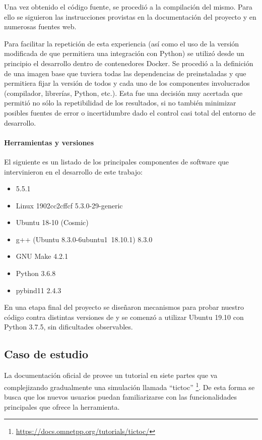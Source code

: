 Una vez obtenido el código fuente, se procedió a la compilación del mismo. Para
ello se siguieron las instrucciones provistas en la documentación del proyecto
y en numerosas fuentes web.

Para facilitar la repetición de esta experiencia (así como el uso de la versión
modificada de \omnetpp{} que permitiera una integración con Python) se utilizó
desde un principio el desarrollo dentro de contenedores Docker. Se procedió a
la definición de una imagen base que tuviera todas las dependencias de \omnetpp{}
preinstaladas y que permitiera fijar la versión de todos y cada uno de los
componentes involucrados (compilador, librerías, Python, etc.). Esta fue una
decisión muy acertada que permitió no sólo la repetibilidad de los resultados,
si no también minimizar posibles fuentes de error o incertidumbre dado el
control casi total del entorno de desarrollo.

\paragraph{Herramientas y versiones}

El siguiente es un listado de los principales componentes de software que
intervinieron en el desarrollo de este trabajo:

\begin{itemize}
    \item \omnetpp{} 5.5.1

    \item Linux 1902cc2cffcf 5.3.0-29-generic

    \item Ubuntu 18-10 (Cosmic)

    \item g++ (Ubuntu 8.3.0-6ubuntu1~18.10.1) 8.3.0

    \item GNU Make 4.2.1

    \item Python 3.6.8

    \item pybind11 2.4.3
\end{itemize}

En una etapa final del proyecto se diseñaron mecanismos para probar nuestro
código contra distintas versiones de \omnetpp{} y se comenzó a utilizar Ubuntu
19.10 con Python 3.7.5, sin dificultades observables.

\subsection{Caso de estudio}
La documentación oficial de \omnetpp{} provee un tutorial en siete partes que
va complejizando gradualmente una simulación llamada ``tictoc''
\footnote{\url{https://docs.omnetpp.org/tutorials/tictoc/}}. De esta forma se
busca que los nuevos usuarios puedan familiarizarse con las funcionalidades
principales que ofrece la herramienta.


